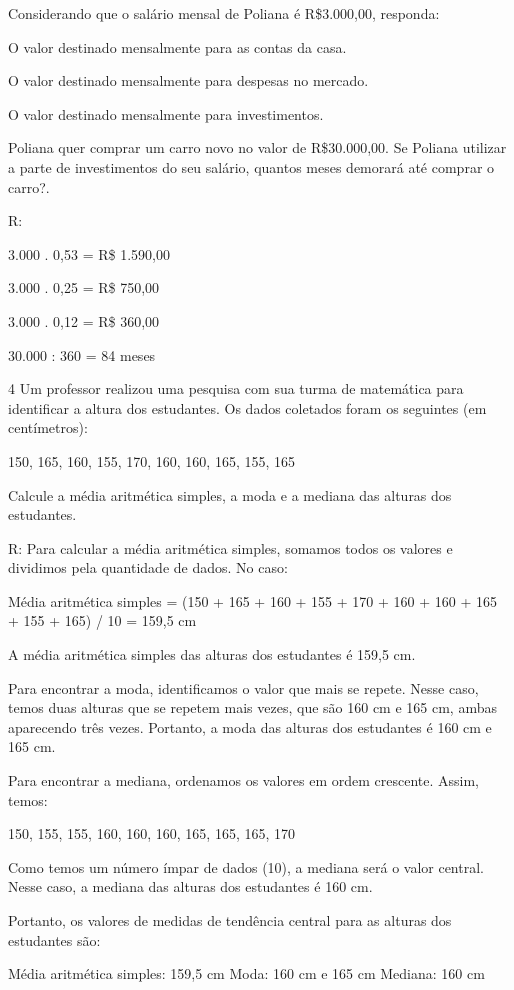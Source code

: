 {Considerando que o salário mensal de Poliana é R\$3.000,00, responda:
\item O valor destinado mensalmente para as contas da casa.
\item O valor destinado mensalmente para despesas no mercado.
\item O valor destinado mensalmente para investimentos.
\item Poliana quer comprar um carro novo no valor de R\$30.000,00. Se
Poliana utilizar a parte de investimentos do seu salário, quantos meses
demorará até comprar o carro?.

R:
\item 3.000 . 0,53 = R\$ 1.590,00
\item 3.000 . 0,25 = R\$ 750,00
\item 3.000 . 0,12 = R\$ 360,00
\item 30.000 : 360 = 84 meses

\num{4} Um professor realizou uma pesquisa com sua turma de matemática para
identificar a altura dos estudantes. Os dados coletados foram os
seguintes (em centímetros):

150, 165, 160, 155, 170, 160, 160, 165, 155, 165

Calcule a média aritmética simples, a moda e a mediana das alturas dos
estudantes.

R: Para calcular a média aritmética simples, somamos todos os valores e
dividimos pela quantidade de dados. No caso:

Média aritmética simples = (150 + 165 + 160 + 155 + 170 + 160 + 160 +
165 + 155 + 165) / 10 = 159,5 cm

A média aritmética simples das alturas dos estudantes é 159,5 cm.

Para encontrar a moda, identificamos o valor que mais se repete. Nesse
caso, temos duas alturas que se repetem mais vezes, que são 160 cm e 165
cm, ambas aparecendo três vezes. Portanto, a moda das alturas dos
estudantes é 160 cm e 165 cm.

Para encontrar a mediana, ordenamos os valores em ordem crescente.
Assim, temos:

150, 155, 155, 160, 160, 160, 165, 165, 165, 170

Como temos um número ímpar de dados (10), a mediana será o valor
central. Nesse caso, a mediana das alturas dos estudantes é 160 cm.

Portanto, os valores de medidas de tendência central para as alturas dos
estudantes são:

Média aritmética simples: 159,5 cm Moda: 160 cm e 165 cm Mediana: 160 cm

}
